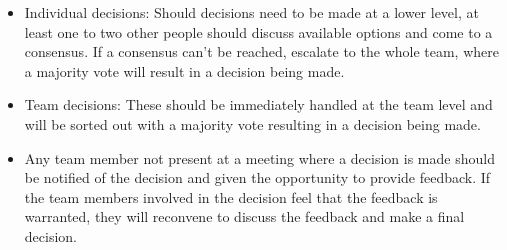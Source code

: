 \documentclass{article}
\begin{document}
\begin{itemize}
  \item Individual decisions: Should decisions need to be made at a lower level, at least one to two other people should discuss available options and come to a consensus. If a consensus can't be reached, escalate to the whole team, where a majority vote will result in a decision being made.
  \item Team decisions: These should be immediately handled at the team level and will be sorted out with a majority vote resulting in a decision being made. 
  \item Any team member not present at a meeting where a decision is made should be notified of the decision and given the opportunity to provide feedback. If the team members involved in the decision feel that the feedback is warranted, they will reconvene to discuss the feedback and make a final decision.
\end{itemize}
\end{document}
